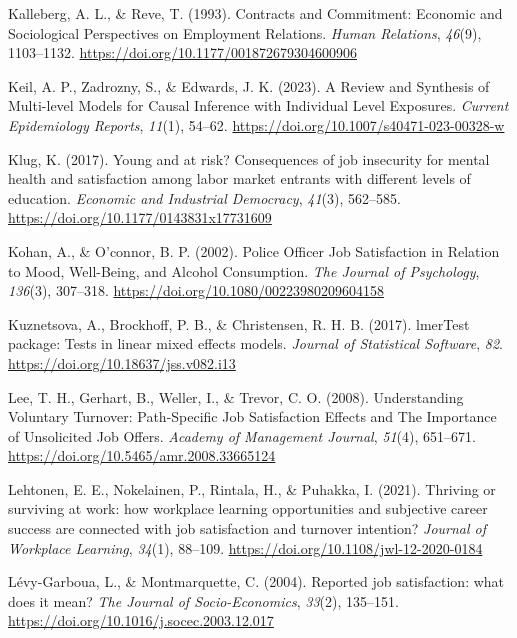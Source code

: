 \documentclass[
]{interact}
\newlength{\cslhangindent}
\newenvironment{CSLReferences}[2] %
 {\begin{list}{}{%
  \setlength{\itemindent}{0pt}
  \setlength{\leftmargin}{0pt}
  \setlength{\parsep}{0pt}
  \ifodd #1
   \setlength{\leftmargin}{\cslhangindent}
   \setlength{\itemindent}{-1\cslhangindent}
  \fi
  \setlength{\itemsep}{#2\baselineskip}}}
 {\end{list}}
\begin{document}
\begin{CSLReferences}{1}{0}
Kalleberg, A. L., \& Reve, T. (1993). Contracts and Commitment: Economic
and Sociological Perspectives on Employment Relations. \emph{Human
Relations}, \emph{46}(9), 1103--1132.
\url{https://doi.org/10.1177/001872679304600906}

Keil, A. P., Zadrozny, S., \& Edwards, J. K. (2023). A Review and
Synthesis of Multi-level Models for Causal Inference with Individual
Level Exposures. \emph{Current Epidemiology Reports}, \emph{11}(1),
54--62. \url{https://doi.org/10.1007/s40471-023-00328-w}

Klug, K. (2017). Young and at risk? Consequences of job insecurity for
mental health and satisfaction among labor market entrants with
different levels of education. \emph{Economic and Industrial Democracy},
\emph{41}(3), 562--585. \url{https://doi.org/10.1177/0143831x17731609}

Kohan, A., \& O'connor, B. P. (2002). Police Officer Job Satisfaction in
Relation to Mood, Well-Being, and Alcohol Consumption. \emph{The Journal
of Psychology}, \emph{136}(3), 307--318.
\url{https://doi.org/10.1080/00223980209604158}

Kuznetsova, A., Brockhoff, P. B., \& Christensen, R. H. B. (2017).
{\textbraceleft}lmerTest{\textbraceright} package: Tests in linear mixed
effects models. \emph{Journal of Statistical Software}, \emph{82}.
\url{https://doi.org/10.18637/jss.v082.i13}

Lee, T. H., Gerhart, B., Weller, I., \& Trevor, C. O. (2008).
Understanding Voluntary Turnover: Path-Specific Job Satisfaction Effects
and The Importance of Unsolicited Job Offers. \emph{Academy of
Management Journal}, \emph{51}(4), 651--671.
\url{https://doi.org/10.5465/amr.2008.33665124}

Lehtonen, E. E., Nokelainen, P., Rintala, H., \& Puhakka, I. (2021).
Thriving or surviving at work: how workplace learning opportunities and
subjective career success are connected with job satisfaction and
turnover intention? \emph{Journal of Workplace Learning}, \emph{34}(1),
88--109. \url{https://doi.org/10.1108/jwl-12-2020-0184}

Lévy-Garboua, L., \& Montmarquette, C. (2004). Reported job
satisfaction: what does it mean? \emph{The Journal of Socio-Economics},
\emph{33}(2), 135--151.
\url{https://doi.org/10.1016/j.socec.2003.12.017}


\end{CSLReferences}
\end{document}
